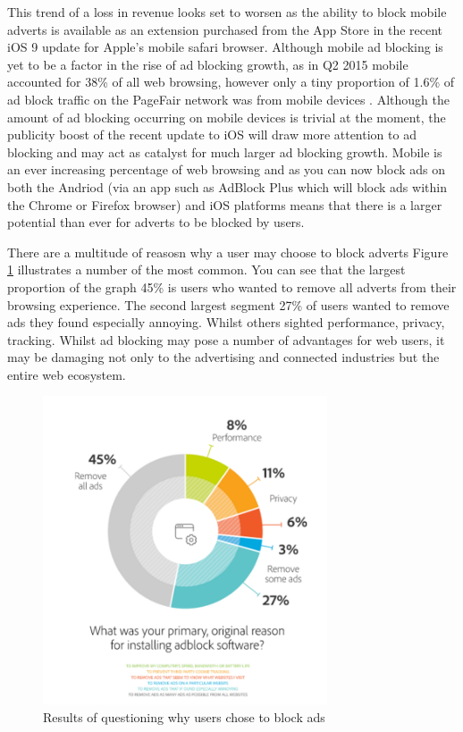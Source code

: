 \documentclass{article}
\begin{document}
This trend of a loss in revenue looks set to worsen as the ability to block mobile adverts is available as an extension purchased from the App Store in the recent iOS 9 update for Apple's mobile safari browser. Although mobile ad blocking is yet to be a factor in the rise of ad blocking growth, as in Q2 2015 mobile accounted for 38\% of all web browsing, however only a tiny proportion of 1.6\% of ad block traffic on the PageFair network was from mobile devices \parencite{adobeAdBlock}. Although the amount of ad blocking occurring on mobile devices is trivial at the moment, the publicity boost of the recent update to iOS will draw more attention to ad blocking and may act as catalyst for  much larger ad blocking growth. Mobile is an ever increasing percentage of web browsing and as you can now block ads on both the Andriod (via an app such as AdBlock Plus which will block ads within the Chrome or Firefox browser) and iOS platforms means that there is a larger potential than ever for adverts to be blocked by users. 

There are a multitude of reasosn why a user may choose to block adverts Figure \ref{fig:whyBlockAds} illustrates a number of the most common. You can see that the largest proportion of the graph 45\% is users who wanted to remove all adverts from their browsing experience. The second largest segment 27\% of users wanted to remove ads they found especially annoying. Whilst others sighted performance, privacy, tracking. Whilst ad blocking may pose a number of advantages for web users, it may be damaging not only to the advertising and connected industries but the entire web ecosystem. 

\begin{figure}[H]
    \centering
    \includegraphics[width=0.75\textwidth]{whyBlockAds}
    \caption{Results of questioning why users chose to block ads \parencite{publishersWeb}}
    \label{fig:whyBlockAds}
\end{figure}
\end{document}
